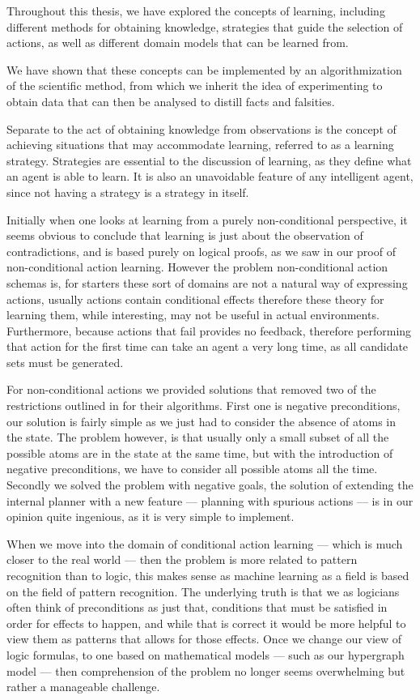 \documentclass[Master.tex]{subfiles}
\begin{document}
Throughout this thesis, we have explored the concepts of learning, including different methods for obtaining knowledge, strategies that guide the selection of actions, as well as different domain models that can be learned from.

We have shown that these concepts can be implemented by an algorithmization of the scientific method, from which we inherit the idea of experimenting to obtain data that can then be analysed to distill facts and falsities.

	Separate to the act of obtaining knowledge from observations is the concept of achieving situations that may accommodate learning, referred to as a learning strategy.
	Strategies are essential to the discussion of learning, as they define what an agent is able to learn.
	It is also an unavoidable feature of any intelligent agent, since not having a strategy is a strategy in itself. 


	Initially when one looks at learning from a purely non-conditional perspective, 
	it seems obvious to conclude that learning is just about the observation of contradictions,
	and is based purely on logical proofs, as we saw in our proof of non-conditional action learning.
	However the problem non-conditional action schemas is, for starters 
	these sort of domains are not a natural way of expressing actions, 
	usually actions contain conditional effects therefore these theory for learning them, 
	while interesting, may not be useful in actual environments.
	Furthermore, because actions that fail provides no feedback, 
	therefore performing that action for the first time can take an agent a very long time, as all candidate sets must be generated.
	
	For non-conditional actions we provided solutions that removed two of the restrictions outlined in \cite{Walsh2008} for their algorithms.
	First one is negative preconditions, our solution is fairly simple as we just had to consider the absence of atoms in the state.
	The problem however, is that usually only a small subset of all the possible atoms are in the state at the same time, 
	but with the introduction of negative preconditions, we have to consider all possible atoms all the time.
	Secondly we solved the problem with negative goals, the solution of extending the internal planner with a new feature --- planning with spurious actions --- is in our opinion quite ingenious, as it is very simple to implement. 
	
	
	When we move into the domain of conditional action learning --- which is much closer to the real world --- 
	then the problem is more related to pattern recognition than to logic, this makes sense as machine learning as a field is based on the field of pattern recognition. 
	The underlying truth is that we as logicians often think of preconditions as just that, conditions that must be satisfied in order for effects to happen, and while that is correct it would be more helpful to view them as patterns that allows for those effects.
	Once we change our view of logic formulas, to one based on mathematical models --- such as our hypergraph model ---	then comprehension of the problem no longer seems overwhelming but rather a manageable challenge. 
	
\end{document}
